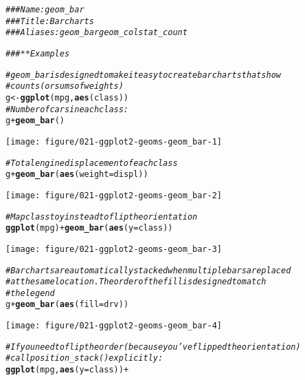 \documentclass[a4paper,titlepage]{tufte-handout}\usepackage[]{graphicx}\usepackage[]{xcolor}
\makeatletter
\def\maxwidth{ %
  \ifdim\Gin@nat@width>\linewidth
    \linewidth
  \else
    \Gin@nat@width
  \fi
}
\newcommand{\hlcom}[1]{\textcolor[rgb]{0.678,0.584,0.686}{\textit{#1}}}%
\newcommand{\hlopt}[1]{\textcolor[rgb]{0,0,0}{#1}}%
\newcommand{\hldef}[1]{\textcolor[rgb]{0.345,0.345,0.345}{#1}}%
\newcommand{\hlkwb}[1]{\textcolor[rgb]{0.69,0.353,0.396}{#1}}%
\newcommand{\hlkwc}[1]{\textcolor[rgb]{0.333,0.667,0.333}{#1}}%
\newcommand{\hlkwd}[1]{\textcolor[rgb]{0.737,0.353,0.396}{\textbf{#1}}}%
\newenvironment{kframe}{%
 \def\at@end@of@kframe{}%
 \ifinner\ifhmode%
  \def\at@end@of@kframe{\end{minipage}}%
  \begin{minipage}{\columnwidth}%
 \fi\fi%
 \def\FrameCommand##1{\hskip\@totalleftmargin \hskip-\fboxsep
 \colorbox{shadecolor}{##1}\hskip-\fboxsep
     \hskip-\linewidth \hskip-\@totalleftmargin \hskip\columnwidth}%
 \MakeFramed {\advance\hsize-\width
   \@totalleftmargin\z@ \linewidth\hsize
   \@setminipage}}%
 {\par\unskip\endMakeFramed%
 \at@end@of@kframe}
\newenvironment{knitrout}{}{} %
\makeatother
\begin{document}
\begin{knitrout}
\color{fgcolor}\begin{kframe}
\begin{alltt}
\hlcom{### Name: geom_bar}
\hlcom{### Title: Bar charts}
\hlcom{### Aliases: geom_bar geom_col stat_count}

\hlcom{### ** Examples}

\hlcom{# geom_bar is designed to make it easy to create bar charts that show}
\hlcom{# counts (or sums of weights)}
\hldef{g} \hlkwb{<-} \hlkwd{ggplot}\hldef{(mpg,} \hlkwd{aes}\hldef{(class))}
\hlcom{# Number of cars in each class:}
\hldef{g} \hlopt{+} \hlkwd{geom_bar}\hldef{()}
\end{alltt}
\end{kframe}
\texttt{[image: figure/021-ggplot2-geoms-geom\_bar-1]} 
\begin{kframe}\begin{alltt}
\hlcom{# Total engine displacement of each class}
\hldef{g} \hlopt{+} \hlkwd{geom_bar}\hldef{(}\hlkwd{aes}\hldef{(}\hlkwc{weight} \hldef{= displ))}
\end{alltt}
\end{kframe}
\texttt{[image: figure/021-ggplot2-geoms-geom\_bar-2]} 
\begin{kframe}\begin{alltt}
\hlcom{# Map class to y instead to flip the orientation}
\hlkwd{ggplot}\hldef{(mpg)} \hlopt{+} \hlkwd{geom_bar}\hldef{(}\hlkwd{aes}\hldef{(}\hlkwc{y} \hldef{= class))}
\end{alltt}
\end{kframe}
\texttt{[image: figure/021-ggplot2-geoms-geom\_bar-3]} 
\begin{kframe}\begin{alltt}
\hlcom{# Bar charts are automatically stacked when multiple bars are placed}
\hlcom{# at the same location. The order of the fill is designed to match}
\hlcom{# the legend}
\hldef{g} \hlopt{+} \hlkwd{geom_bar}\hldef{(}\hlkwd{aes}\hldef{(}\hlkwc{fill} \hldef{= drv))}
\end{alltt}
\end{kframe}
\texttt{[image: figure/021-ggplot2-geoms-geom\_bar-4]} 
\begin{kframe}\begin{alltt}
\hlcom{# If you need to flip the order (because you've flipped the orientation)}
\hlcom{# call position_stack() explicitly:}
\hlkwd{ggplot}\hldef{(mpg,} \hlkwd{aes}\hldef{(}\hlkwc{y} \hldef{= class))} \hlopt{+}

\end{alltt}
\end{kframe}
\end{knitrout}
\end{document}
